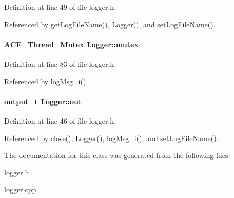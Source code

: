 Definition at line 49 of file logger.h.

Referenced by get\-Log\-File\-Name(), Logger(), and set\-Log\-File\-Name().\hypertarget{classLogger_Loggero3}{
\paragraph[mutex\_\-]{\setlength{\rightskip}{0pt plus 5cm}ACE\_\-Thread\_\-Mutex Logger::mutex\_\-}\hfill}
\label{classLogger_Loggero3}




Definition at line 83 of file logger.h.

Referenced by log\-Msg\_\-i().\hypertarget{classLogger_Loggero0}{
\paragraph[out\_\-]{\setlength{\rightskip}{0pt plus 5cm}\hyperlink{logger_8h_a3}{output\_\-t} Logger::out\_\-}\hfill}
\label{classLogger_Loggero0}




Definition at line 46 of file logger.h.

Referenced by close(), Logger(), log\-Msg\_\-i(), and set\-Log\-File\-Name().

The documentation for this class was generated from the following files:\begin{CompactItemize}
\item 
\hyperlink{logger_8h}{logger.h}\item 
\hyperlink{logger_8cpp}{logger.cpp}\end{CompactItemize}
